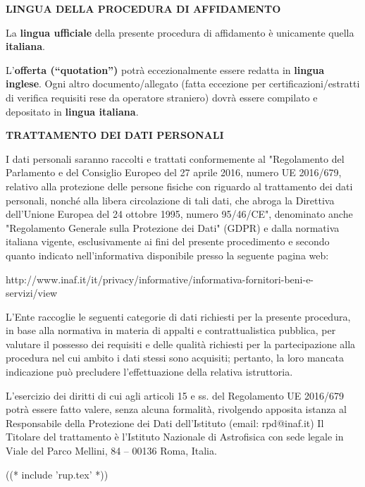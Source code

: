 \documentclass[a4paper,12pt]{letter}
\begin{document}
\textbf{LINGUA DELLA PROCEDURA DI AFFIDAMENTO}

La \textbf{lingua ufficiale} della presente procedura di affidamento è unicamente quella \textbf{italiana}. 

L’\textbf{offerta (“quotation”)} potrà eccezionalmente essere redatta in \textbf{lingua inglese}. Ogni altro documento/allegato (fatta eccezione per certificazioni/estratti di verifica requisiti rese da operatore straniero) dovrà essere compilato e depositato in \textbf{lingua italiana}.

\textbf{TRATTAMENTO DEI DATI PERSONALI}

I dati personali saranno raccolti e trattati conformemente al "Regolamento del Parlamento e del Consiglio Europeo del 27 aprile 2016, numero UE 2016/679,  relativo alla protezione delle persone fisiche con riguardo al trattamento dei dati personali, nonché alla libera circolazione di tali dati, che abroga la Direttiva dell’Unione Europea del 24 ottobre 1995, numero 95/46/CE", denominato anche "Regolamento Generale sulla Protezione
dei Dati" (GDPR) e dalla normativa italiana vigente, esclusivamente ai fini del presente procedimento e secondo quanto indicato nell’informativa disponibile presso la seguente pagina web:

http://www.inaf.it/it/privacy/informative/informativa-fornitori-beni-e-servizi/view

L’Ente raccoglie le seguenti categorie di dati richiesti per la presente procedura, in base alla normativa in materia di appalti e contrattualistica pubblica, per valutare il possesso dei requisiti e delle qualità richiesti per la partecipazione alla procedura nel cui ambito i dati stessi sono acquisiti; pertanto, la loro mancata indicazione può precludere l’effettuazione della relativa istruttoria.

L’esercizio dei diritti di cui agli articoli 15 e ss. del Regolamento UE 2016/679 potrà essere fatto valere, senza alcuna formalità, rivolgendo apposita istanza al Responsabile della Protezione dei Dati dell’Istituto (email: rpd@inaf.it) Il Titolare del trattamento è l’Istituto Nazionale di Astrofisica con sede legale in Viale del Parco Mellini, 84 – 00136 Roma, Italia.

((* include 'rup.tex' *))
\end{document}
